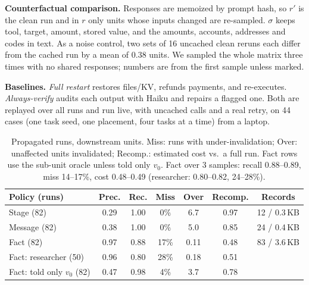 \documentclass[10pt,twocolumn,letterpaper]{article}
\newcommand{\para}[1]{\vspace{1pt}\noindent\textbf{#1}\enspace}
\begin{document}
\para{Counterfactual comparison.} Responses are memoized by prompt hash, so $r'$ is the clean run
and in $r$ only units whose inputs changed are re-sampled. $\sigma$ keeps tool, target, amount,
stored value, and the amounts, accounts, addresses and codes in text. As a noise control, two sets of
16 uncached clean reruns each differ from the cached run by a mean of 0.38 units. We sampled the whole
matrix three times with no shared responses; numbers are from the first sample unless marked.

\para{Baselines.} \emph{Full restart} restores files/KV, refunds payments, and re-executes.
\emph{Always-verify} audits each output with Haiku and repairs a flagged one. Both are replayed over
all runs and run live, with uncached calls and a real retry, on 44 cases (one task seed, one
placement, four tasks at a time) from a laptop.

\begin{table}[t]
\centering\small
\setlength{\tabcolsep}{1.6pt}
\begin{tabular}{@{}lcccccc@{}}
\toprule
Policy (runs) & Prec. & Rec. & Miss & Over & Recomp. & Records \\
\midrule
Stage (82)   & 0.29 & 1.00 & 0\%  & 6.7  & 0.97 & 12 / 0.3\,KB \\
Message (82) & 0.38 & 1.00 & 0\%  & 5.0  & 0.85 & 24 / 0.4\,KB \\
Fact (82)    & 0.97 & 0.88 & 17\% & 0.11 & 0.48 & 83 / 3.6\,KB \\
\midrule
Fact: researcher (50) & 0.96 & 0.80 & 28\% & 0.18 & 0.51 & \\
Fact: told only $v_0$ (82) & 0.47 & 0.98 & 4\% & 3.7 & 0.78 & \\
\bottomrule
\end{tabular}
\caption{Propagated runs, downstream units. Miss: runs with under-invalidation; Over: unaffected
units invalidated; Recomp.: estimated cost vs.\ a full run. Fact rows use the sub-unit oracle unless
told only $v_0$. Fact over 3 samples: recall 0.88--0.89, miss 14--17\%, cost 0.48--0.49 (researcher:
0.80--0.82, 24--28\%).}
\label{tab:gran}
\vspace{-0.4em}
\end{table}
\end{document}
